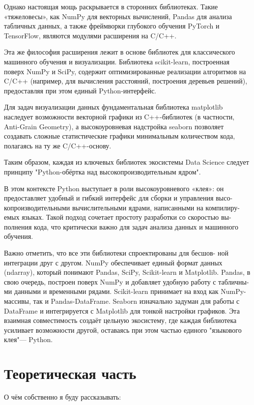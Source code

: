 \documentclass[pract]{SCWorks}
\begin{document}
Однако настоящая мощь раскрывается в сторонних библиотеках. Такие «тяжеловесы», как NumPy для векторных вычислений, 
Pandas для анализа табличных данных, а также фреймворки глубокого обучения PyTorch и TensorFlow, являются модулями 
расширения на C/C++.

Эта же философия расширения лежит в основе библиотек для классического машинного обучения и визуализации. 
Библиотека scikit-learn, построенная поверх NumPy и SciPy, содержит оптимизированные реализации алгоритмов 
на C/C++ (например, для вычисления расстояний, построения деревьев решений), предоставляя при этом единый 
Python-интерфейс. 

Для задач визуализации данных фундаментальная библиотека matplotlib наследует возможности векторной графики 
из C++-библиотек (в частности, Anti-Grain Geometry), а высокоуровневая надстройка seaborn позволяет создавать 
сложные статистические графики минимальным количеством кода, полагаясь на ту же C/C++-основу. 

Таким образом, каждая из ключевых библиотек экосистемы Data Science следует принципу 
"Python-обёртка над высокопроизводительным ядром".

В этом контексте Python выступает в роли высокоуровневого «клея»: он
предоставляет удобный и гибкий интерфейс для сборки и управления высо-
копроизводительными вычислительными ядрами, написанными на компилиру-
емых языках. Такой подход сочетает простоту разработки со скоростью вы-
полнения кода, что критически важно для задач анализа данных и машинного
обучения.

Важно отметить, что все эти библиотеки спроектированы для бесшов-
ной интеграции друг с другом. NumPy обеспечивает единый формат данных
(ndarray), который понимают Pandas, SciPy, Scikit-learn и Matplotlib. Pandas, в
свою очередь, построен поверх NumPy и добавляет удобную работу с табличны-
ми данными и временными рядами. Scikit-learn принимает на вход как NumPy-
массивы, так и Pandas-DataFrame. Seaborn изначально задуман для работы с
DataFrame и интегрируется с Matplotlib для тонкой настройки графиков. Эта
взаимная совместимость создаёт цельную экосистему, где каждая библиотека
усиливает возможности другой, оставаясь при этом частью единого "языкового
клея"— Python.

\section{Теоретическая часть}

О чём собственно я буду рассказывать:
\end{document}
